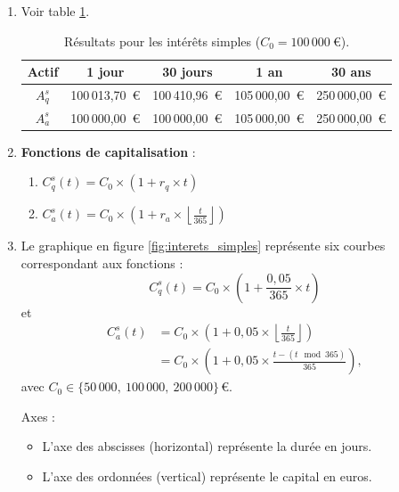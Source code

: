 \documentclass{article}
\begin{document}
\begin{enumerate}[label=\textbf{R1.\arabic*}]
    \item Voir table \ref{tab:simple_interest_results}.
          \begin{table}[h!]
              \centering
              \begin{tabular}{|c|c|c|c|c|}
                  \hline
                  \textbf{Actif} & \textbf{1 jour}  & \textbf{30 jours} & \textbf{1 an}    & \textbf{30 ans}  \\
                  \hline
                  \( A_q^s \)    & 100\,013,70\ € & 100\,410,96\ €  & 105\,000,00\ € & 250\,000,00\ € \\
                  \hline
                  \( A_a^s \)    & 100\,000,00\ € & 100\,000,00\ €  & 105\,000,00\ € & 250\,000,00\ € \\
                  \hline
              \end{tabular}
              \caption{Résultats pour les intérêts simples (\( C_0 = 100\,000\ \text{€} \)).}
              \label{tab:simple_interest_results}
          \end{table}
          
    \item \textbf{Fonctions de capitalisation} :
          \begin{enumerate}[label=(\alph*)]
              \item \( C_q^s(t) = C_0 \times \left(1 + r_q \times t\right) \)
              \item \( C_a^s(t) = C_0 \times \left(1 + r_a \times \left\lfloor\frac{t}{365}\right\rfloor\right) \)
          \end{enumerate}
          
    \item Le graphique en figure \ref{fig:interets_simples} représente six courbes correspondant aux fonctions :
          \[
              C_q^s(t) = C_0 \times \left(1 + \frac{0{,}05}{365} \times t\right)
          \]
          et
          \[
              \begin{aligned}
                  C_a^s(t) & = C_0 \times \left(1 + 0{,}05 \times \left\lfloor\frac{t}{365}\right\rfloor\right) \\
                           & = C_0 \times \left(1 + 0{,}05 \times \frac{t - (t \!\!\!\mod 365)}{365}\right),    
              \end{aligned}
          \]
          avec \( C_0 \in \bigl\{50\,000,\ 100\,000,\ 200\,000\bigr\}\,\text{€} \).
          
          Axes :
          \begin{itemize}
              \item L'axe des abscisses (horizontal) représente la durée en jours.
              \item L'axe des ordonnées (vertical) représente le capital en euros.
          \end{itemize}
          

\end{enumerate}
\end{document}
